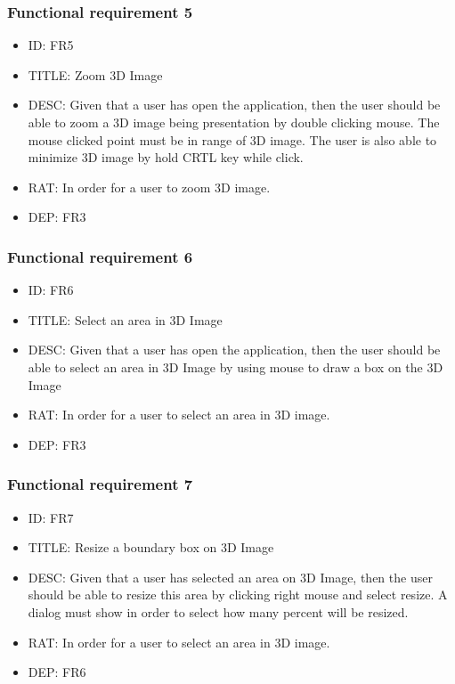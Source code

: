 \documentclass[11pt]{article}
\begin{document}
\subsubsection{Functional requirement 5}
\begin{itemize}
\item ID: FR5
\item TITLE: Zoom 3D Image
\item DESC: Given that a user has open the application, then the user should be able to zoom a 3D image being presentation by double clicking mouse. The mouse clicked point must be in range of 3D image. The user is also able to minimize 3D image by hold CRTL key while click.
\item RAT: In order for a user to zoom 3D image.
\item DEP: FR3
\end{itemize}
\subsubsection{Functional requirement 6}
\begin{itemize}
\item ID: FR6
\item TITLE: Select an area in 3D Image
\item DESC: Given that a user has open the application, then the user should be able to select an area in 3D Image by using mouse to draw a box on the 3D Image
\item RAT: In order for a user to select an area in 3D image.
\item DEP: FR3
\end{itemize}
\subsubsection{Functional requirement 7}
\begin{itemize}
\item ID: FR7
\item TITLE: Resize a boundary box on 3D Image
\item DESC: Given that a user has selected an area on 3D Image, then the user should be able to resize this area by clicking right mouse and select resize. A dialog must show in order to select how many percent will be resized.
\item RAT: In order for a user to select an area in 3D image.
\item DEP: FR6
\end{itemize}
\end{document}
